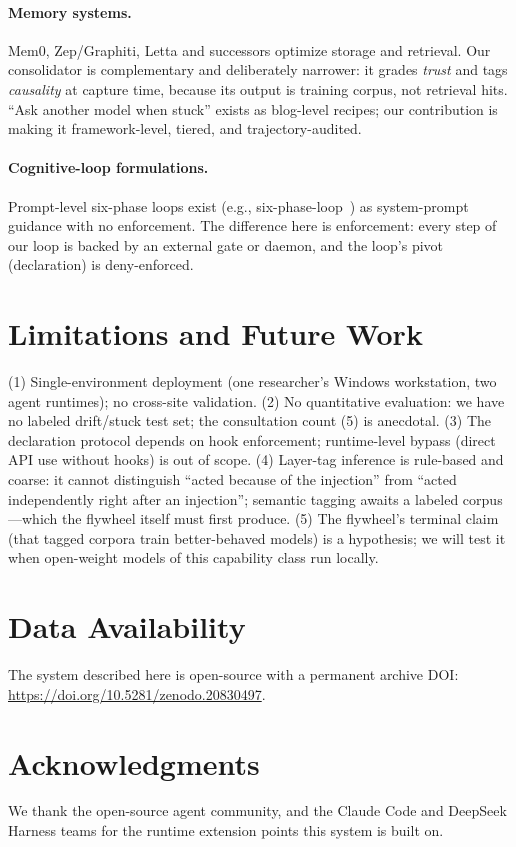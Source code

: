 \documentclass{article}
\begin{document}
\paragraph{Memory systems.}
Mem0, Zep/Graphiti, Letta and successors optimize storage and retrieval. Our consolidator is complementary and deliberately narrower: it grades \emph{trust} and tags \emph{causality} at capture time, because its output is training corpus, not retrieval hits. ``Ask another model when stuck'' exists as blog-level recipes; our contribution is making it framework-level, tiered, and trajectory-audited.

\paragraph{Cognitive-loop formulations.}
Prompt-level six-phase loops exist (e.g., six-phase-loop~\cite{sixphase}) as system-prompt guidance with no enforcement. The difference here is enforcement: every step of our loop is backed by an external gate or daemon, and the loop's pivot (declaration) is deny-enforced.

\section{Limitations and Future Work}

(1) Single-environment deployment (one researcher's Windows workstation, two agent runtimes); no cross-site validation. (2) No quantitative evaluation: we have no labeled drift/stuck test set; the consultation count (5) is anecdotal. (3) The declaration protocol depends on hook enforcement; runtime-level bypass (direct API use without hooks) is out of scope. (4) Layer-tag inference is rule-based and coarse: it cannot distinguish ``acted because of the injection'' from ``acted independently right after an injection''; semantic tagging awaits a labeled corpus---which the flywheel itself must first produce. (5) The flywheel's terminal claim (that tagged corpora train better-behaved models) is a hypothesis; we will test it when open-weight models of this capability class run locally.

\section*{Data Availability}
The system described here is open-source with a permanent archive DOI: \url{https://doi.org/10.5281/zenodo.20830497}.

\section*{Acknowledgments}
We thank the open-source agent community, and the Claude Code and DeepSeek Harness teams for the runtime extension points this system is built on.
\end{document}
